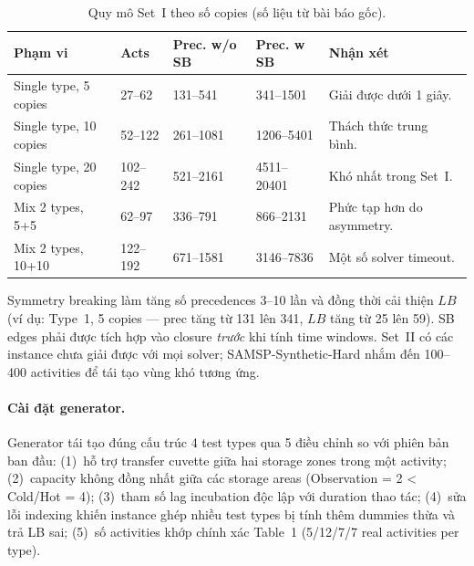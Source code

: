\documentclass[11pt,a4paper]{article}
\theoremstyle{remark}
\begin{document}
\begin{table}[htbp]
\centering
\caption{Quy mô Set~I theo số copies (số liệu từ bài báo gốc).}
\label{tab:set1stats}
\begin{tabularx}{\textwidth}{@{}p{}ZZZY@{}}
\toprule
\textbf{Phạm vi} & \textbf{Acts} & \textbf{Prec. w/o SB} & \textbf{Prec. w SB} & \textbf{Nhận xét}\\
\midrule
Single type, 5 copies  & 27--62   & 131--541  & 341--1501   & Giải được dưới 1 giây.\\
Single type, 10 copies & 52--122  & 261--1081 & 1206--5401  & Thách thức trung bình.\\
Single type, 20 copies & 102--242 & 521--2161 & 4511--20401 & Khó nhất trong Set~I.\\
Mix 2 types, 5+5       & 62--97   & 336--791  & 866--2131   & Phức tạp hơn do asymmetry.\\
Mix 2 types, 10+10     & 122--192 & 671--1581 & 3146--7836  & Một số solver timeout.\\
\bottomrule
\end{tabularx}
\end{table}

Symmetry breaking làm tăng số precedences 3--10 lần và đồng thời cải thiện $LB$
(ví dụ: Type~1, 5 copies --- prec tăng từ 131 lên 341, $LB$ tăng từ 25 lên 59).
SB edges phải được tích hợp vào closure \emph{trước} khi tính time windows.
Set~II có các instance chưa giải được với mọi solver;
SAMSP-Synthetic-Hard nhắm đến 100--400 activities để tái tạo vùng khó tương ứng.

\paragraph{Cài đặt generator.}

Generator tái tạo đúng cấu trúc 4 test types qua 5 điều chỉnh so với phiên bản ban đầu:
(1)~hỗ trợ transfer cuvette giữa hai storage zones trong một activity;
(2)~capacity không đồng nhất giữa các storage areas (Observation = 2 < Cold/Hot = 4);
(3)~tham số lag incubation độc lập với duration thao tác;
(4)~sửa lỗi indexing khiến instance ghép nhiều test types bị tính thêm dummies thừa và trả LB sai;
(5)~số activities khớp chính xác Table~1 (5/12/7/7 real activities per type).
\end{document}
